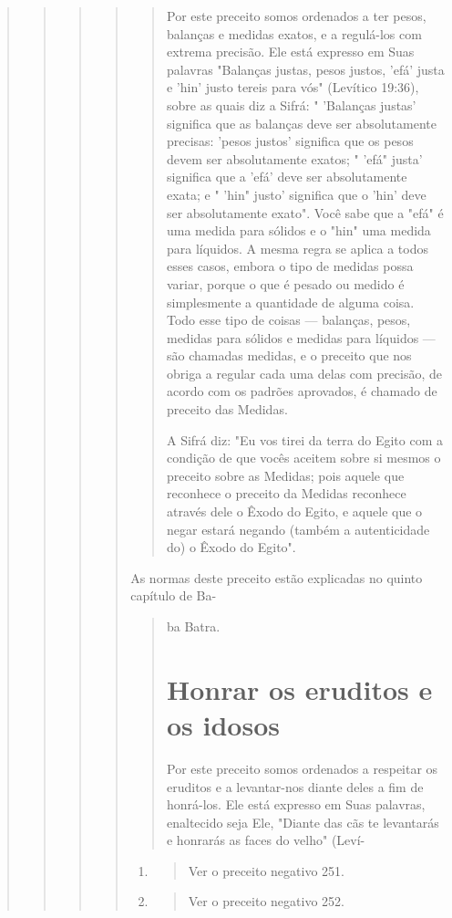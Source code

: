 \begin{quote}
\begin{quote}
\begin{quote}
\begin{quote}
\begin{quote}
Por este preceito somos ordenados a ter pesos, balanças e medidas
exatos, e a regulá-los com extrema precisão. Ele está expresso em Suas
palavras "Balanças justas, pesos justos, 'efá' justa e 'hin' justo
tereis para vós" (Levítico 19:36), sobre as quais diz a Sifrá: "
'Balanças justas' significa que as balanças deve ser absolutamente
precisas: 'pesos justos' significa que os pesos devem ser absolutamente
exatos; " 'efá" justa' significa que a 'efá' deve ser absoluta­mente
exata; e " 'hin" justo' significa que o 'hin' deve ser absolutamente
exa­to". Você sabe que a "efá" é uma medida para sólidos e o "hin" uma
medida para líquidos. A mesma regra se aplica a todos esses casos,
embora o tipo de medidas possa variar, porque o que é pesado ou medido é
simplesmente a quan­tidade de alguma coisa. Todo esse tipo de coisas ---
balanças, pesos, medidas para sólidos e medidas para líquidos --- são
chamadas medidas, e o preceito que nos obriga a regular cada uma delas
com precisão, de acordo com os pa­drões aprovados, é chamado de preceito
das Medidas.

A Sifrá diz: "Eu vos tirei da terra do Egito com a condição de que vocês
aceitem sobre si mesmos o preceito sobre as Medidas; pois aquele que
reconhece o preceito da Medidas reconhece através dele o Êxodo do Egito,
e aquele que o negar estará negando (também a autenticidade do) o Êxodo
do Egito".
\end{quote}

As normas deste preceito estão explicadas no quinto capítulo de Ba-

\begin{quote}
ba Batra.

\section{Honrar os eruditos e os idosos}

Por este preceito somos ordenados a respeitar os eruditos e a
levantar-nos diante deles a fim de honrá-los. Ele está expresso em Suas
palavras, enalte­cido seja Ele, "Diante das cãs te levantarás e honrarás
as faces do velho" (Leví-
\end{quote}

\begin{enumerate}
\def\labelenumi{\arabic{enumi}.}
\setcounter{enumi}{206}
\item
 \begin{quote}
 Ver o preceito negativo 251.
 \end{quote}
\item
 \begin{quote}
 Ver o preceito negativo 252.
 \end{quote}
\end{enumerate}


\end{quote}
\end{quote}
\end{quote}
\end{quote}
